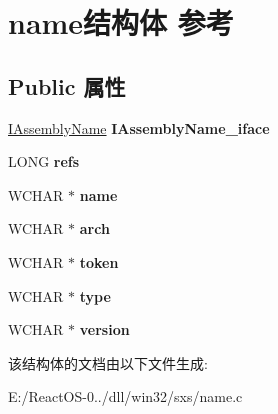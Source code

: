 \hypertarget{structname}{}\section{name结构体 参考}
\label{structname}
\subsection*{Public 属性}
\begin{DoxyCompactItemize}
\item 
\mbox{\label{structname_afec933388a8248ae69457c25fddf7234}} 
\hyperlink{interface_i_assembly_name}{I\+Assembly\+Name} {\bfseries I\+Assembly\+Name\+\_\+iface}
\item 
\mbox{\label{structname_af7e4fcd46b3bc32d81e1c7d2797e74f2}} 
L\+O\+NG {\bfseries refs}
\item 
\mbox{\label{structname_a5e8424db71d0678d5c445470f9ed088c}} 
W\+C\+H\+AR $\ast$ {\bfseries name}
\item 
\mbox{\label{structname_a04887e6611e1eb9f3df4cdb99fa6c1b4}} 
W\+C\+H\+AR $\ast$ {\bfseries arch}
\item 
\mbox{\label{structname_a4c07525e11f2ad58e33fbeab600d1adb}} 
W\+C\+H\+AR $\ast$ {\bfseries token}
\item 
\mbox{\label{structname_a0ffd8adc878d7119311bca4ce0f68283}} 
W\+C\+H\+AR $\ast$ {\bfseries type}
\item 
\mbox{\label{structname_ac99a32fb6c42dc981c864e116b618dc1}} 
W\+C\+H\+AR $\ast$ {\bfseries version}
\end{DoxyCompactItemize}


该结构体的文档由以下文件生成\+:\begin{DoxyCompactItemize}
\item 
E\+:/\+React\+O\+S-\/0../dll/win32/sxs/name.\+c\end{DoxyCompactItemize}

